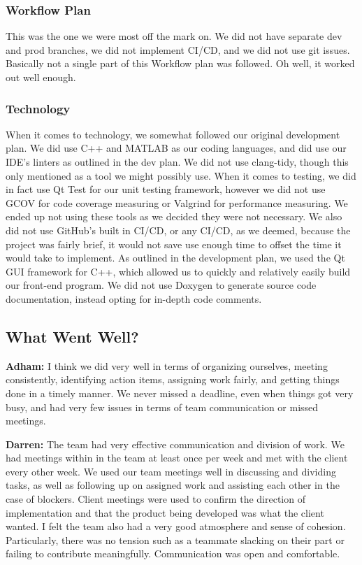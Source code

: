 \documentclass{article}
\begin{document}
\subsubsection{Workflow Plan}
This was the one we were most off the mark on. We did not have separate dev and prod branches, we did not implement CI/CD, and we did not use git issues. Basically not a single
part of this Workflow plan was followed. Oh well, it worked out well enough.


\subsubsection{Technology}
When it comes to technology, we somewhat followed our original development plan. We did use C++ and MATLAB as our coding languages, 
and did use our IDE's linters as outlined in the dev plan. We did not use clang-tidy, though this only mentioned as a tool we might possibly use. 
When it comes to testing, we did in fact use Qt Test for our unit testing framework, however we did not use GCOV for code coverage measuring or Valgrind 
for performance measuring. We ended up not using these tools as we decided they were not necessary. We also did not use GitHub's built in CI/CD, or any CI/CD, 
as we deemed, because the project was fairly brief, it would not save use enough time to offset the time it would take to implement. As outlined in the development plan, 
we used the Qt GUI framework for C++, which allowed us to quickly and relatively easily build our front-end program. We did not use Doxygen to generate source code 
documentation, instead opting for in-depth code comments.

\subsection{What Went Well?}

\textbf{Adham:} I think we did very well in terms of organizing ourselves, meeting consistently, identifying action items, assigning work fairly, and getting things done in 
a timely manner. We never missed a deadline, even when things got very busy, and had very few issues in terms of team communication or missed meetings.

\textbf{Darren:} The team had very effective communication and division of work. We had meetings  within in the team at least once per week and met with the client every other week. We used our team meetings well in discussing and dividing tasks, as well as following up on assigned work and assisting each other in the case of blockers. Client meetings were used to confirm the direction of implementation and that the product being developed was what the client wanted. I felt the team also had a very good atmosphere and sense of cohesion. Particularly, there was no tension such as a teammate slacking on their part or failing to contribute meaningfully. Communication was open and comfortable.
\end{document}
